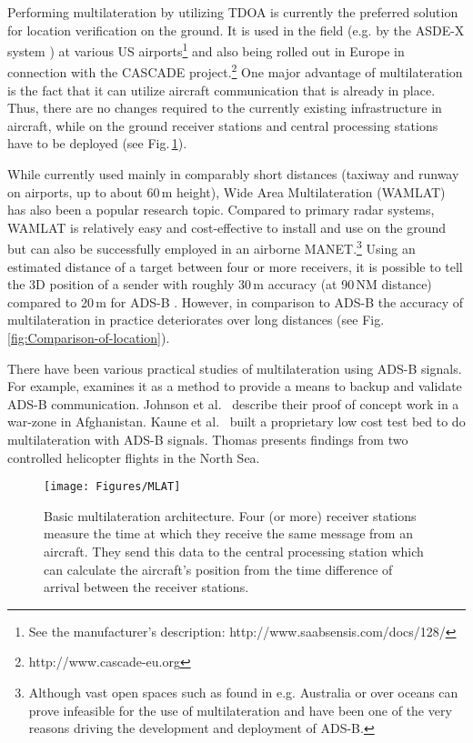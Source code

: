 \documentclass[english]{IEEEtran}
\begin{document}
Performing multilateration by utilizing TDOA is currently the preferred
solution for location verification on the ground. It is used in the
field (e.g. by the ASDE-X system \cite{HerreroJ.G.;BesadaPortasJ.A.;RodriguezF.J.Jimenez;Corredera1999})
at various US airports\footnote{See the manufacturer's description: http://www.saabsensis.com/docs/128/} and also being rolled out in Europe in connection with the CASCADE
project.\footnote{http://www.cascade-eu.org} One major advantage of multilateration is the fact that it can utilize
aircraft communication that is already in place. Thus, there are no
changes required to the currently existing infrastructure in aircraft,
while on the ground receiver stations and central processing stations
have to be deployed (see Fig.\,\ref{fig:MLAT-architecture.}).

While currently used mainly in comparably short distances (taxiway
and runway on airports, up to about 60\,m height), Wide Area Multilateration
(WAMLAT) has also been a popular research topic. Compared to primary
radar systems, WAMLAT is relatively easy and cost-effective to install
and use on the ground but can also be successfully employed in an
airborne MANET.\footnote{Although vast open spaces such as found in e.g. Australia or over
oceans can prove infeasible for the use of multilateration and have
been one of the very reasons driving the development and deployment
of ADS-B.} Using an estimated distance of a target between four or more receivers,
it is possible to tell the 3D position of a sender with roughly 30\,m
accuracy (at 90\,NM distance) compared to 20\,m for ADS-B \cite{Purton2010}.
However, in comparison to ADS-B the accuracy of multilateration in
practice deteriorates over long distances (see Fig.\,\ref{fig:Comparison-of-location}). 

There have been various practical studies of multilateration using
ADS-B signals. For example, \cite{Smith2006} examines it as a method
to provide a means to backup and validate ADS-B communication. Johnson
et al.~\cite{Johnson2012} describe their proof of concept work in
a war-zone in Afghanistan. Kaune et al.~\cite{Kaune2012} built a
proprietary low cost test bed to do multilateration with ADS-B signals.
Thomas \cite{Thomas2011a} presents findings from two controlled helicopter
flights in the North Sea.
\begin{figure}
\begin{centering}
\texttt{[image: Figures/MLAT]}
\par\end{centering}

\caption{Basic multilateration architecture. Four (or more) receiver stations
measure the time at which they receive the same message from an aircraft.
They send this data to the central processing station which can calculate
the aircraft's position from the time difference of arrival between
the receiver stations. \label{fig:MLAT-architecture.}}
\end{figure}
\end{document}
